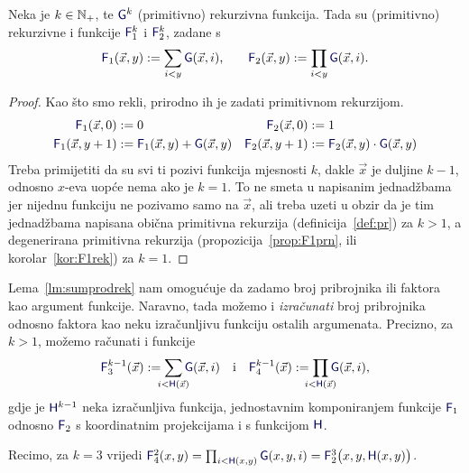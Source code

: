 \begin{lema}[{name=[ograničene sume i produkti čuvaju (primitivnu) rekurzivnost]}]\label{lm:sumprodrek}
    Neka je $k\in{\mathbb N}_+$, te $\f G^k$\! (primitivno) rekurzivna funkcija. Tada su (primitivno) rekurzivne i funkcije $\f F_1^k$ i $\f F_2^k$, zadane s
\begin{equation}
    \f F_1(\vec x,y):=\sum_{i<y}\f G(\vec x,i)\text,\qquad
    \f F_2(\vec x,y):=\prod_{i<y}\f G(\vec x,i)\text.
\end{equation}
\end{lema}
\begin{proof}
    Kao što smo rekli, prirodno ih je zadati primitivnom rekurzijom.
    \begin{align}
        \label{eq:sumG1}\f F_1(\vec x,0)&:=0&\f F_2(\vec x,0)&:=1
        \\
        \label{eq:sumH1}
        \f F_1(\vec x,y+1)&:=\f F_1(\vec x,y)+\f G(\vec x,y)&
        \f F_2(\vec x,y+1)&:=\f F_2(\vec x,y)\cdot\f G(\vec x,y)
    \end{align}
Treba primijetiti da su svi ti pozivi funkcija mjesnosti $k$, dakle $\vec x$ je duljine $k-1$, odnosno $x$-eva uopće nema ako je $k=1$. To ne smeta u napisanim jednadžbama jer nijednu funkciju ne pozivamo samo na $\vec x$, ali treba uzeti u obzir da je tim jednadžbama napisana obična primitivna rekurzija (definicija~\ref{def:pr}) za $k>1$, a degenerirana primitivna rekurzija (propozicija~\ref{prop:F1prn}, ili korolar~\ref{kor:F1rek}) za $k=1$.
\end{proof}

\begin{napomena}[{name=[(primitivno) rekurzivne granice]}]\label{nap:sumprodH}
    Lema~\ref{lm:sumprodrek} nam omogućuje da zadamo broj pribrojnika ili faktora kao argument funkcije. Naravno, tada možemo i \emph{izračunati} broj pribrojnika odnosno faktora kao neku izračunljivu funkciju ostalih argumenata. Precizno, za $k>1$, možemo računati i funkcije
\begin{equation}
    \f F_3^{k-1}(\vec x):=\sum_{\mathclap{i<\f H(\vec x)}}\f G(\vec x,i)
    \text{\quad i\quad}\f F_4^{k-1}(\vec x):=\prod_{\mathclap{i<\f H(\vec x)}}\f G(\vec x,i)\text,
\end{equation}
gdje je $\f H^{k-1}$ neka izračunljiva funkcija, jednostavnim komponiranjem funkcije $\f F_1$ odnosno $\f F_2$ s koordinatnim projekcijama i s funkcijom $\f H$.

Recimo, za $k=3$ vrijedi $\f F_4^2(x,y)=\prod_{i<\f H(x,y)}\f G(x,y,i)=\f F_2^3\bigl(x,y,\f H(x,y)\bigr)$.
\end{napomena}

